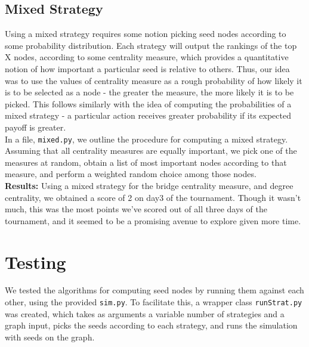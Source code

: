 \documentclass{article}
\begin{document}
\subsection*{Mixed Strategy}
    Using a mixed strategy requires some notion picking seed nodes according to some
    probability distribution. Each strategy will output 
    the rankings of the top X nodes, according to some centrality measure, 
    which provides a quantitative notion of how important a particular seed is relative 
    to others. Thus, our idea was to use the values of centrality measure as a rough
    probability of how likely it is to be selected as a node - the greater the measure,
    the more likely it is to be picked. This follows similarly with the idea of computing
    the probabilities of a mixed strategy - a particular action receives greater 
    probability if its expected payoff is greater. 
    \\
    In a file, \texttt{mixed.py}, we outline the procedure for computing a mixed strategy.
    Assuming that all centrality measures are equally important, we pick one of the
    measures at random, obtain a list of most important nodes according to that measure,
    and perform a weighted random choice among those nodes.
    \\
    \textbf{Results:} Using a mixed strategy for the bridge centrality measure,
    and degree centrality, we obtained a score of 2 on day3 of 
    the tournament. Though it wasn't much,
    this was the most points we've scored out of all three days of the tournament,
    and it seemed to be a promising avenue to explore given more time.
    
\section{Testing}
    We tested the algorithms for computing seed nodes by running them against
    each other, using the provided \texttt{sim.py}. To facilitate this,
    a wrapper class \texttt{runStrat.py} was created, which takes as arguments
    a variable number of strategies and a graph input, picks the seeds according to each strategy,
    and runs the simulation with seeds on the graph.



 
\end{document}
